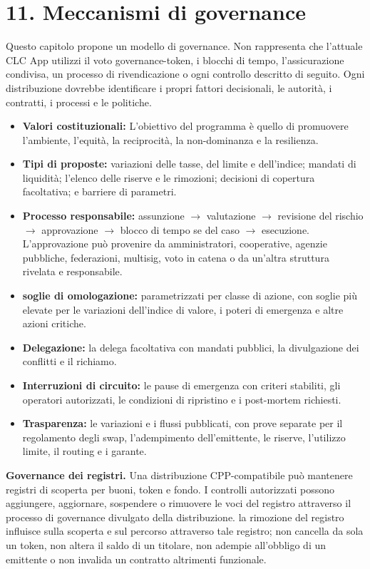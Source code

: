 \documentclass[11pt]{article}
\begin{document}
\section*{11. Meccanismi di governance}

Questo capitolo propone un modello di governance. Non rappresenta che l'attuale CLC App utilizzi il voto governance-token, i blocchi di tempo, l'assicurazione condivisa, un processo di rivendicazione o ogni controllo descritto di seguito. Ogni distribuzione dovrebbe identificare i propri fattori decisionali, le autorità, i contratti, i processi e le politiche.

\begin{itemize}[leftmargin=*]
\item \textbf{Valori costituzionali:} L'obiettivo del programma è quello di promuovere l'ambiente, l'equità, la reciprocità, la non-dominanza e la resilienza.
\item \textbf{Tipi di proposte:} variazioni delle tasse, del limite e dell'indice; mandati di liquidità; l'elenco delle riserve e le rimozioni; decisioni di copertura facoltativa; e barriere di parametri.
\item \textbf{Processo responsabile:} assunzione $\to$ valutazione $\to$ revisione del rischio $\to$ approvazione $\to$ blocco di tempo se del caso $\to$ esecuzione. L'approvazione può provenire da amministratori, cooperative, agenzie pubbliche, federazioni, multisig, voto in catena o da un'altra struttura rivelata e responsabile.
\item \textbf{soglie di omologazione:} parametrizzati per classe di azione, con soglie più elevate per le variazioni dell'indice di valore, i poteri di emergenza e altre azioni critiche.
\item \textbf{Delegazione:} la delega facoltativa con mandati pubblici, la divulgazione dei conflitti e il richiamo.
\item \textbf{Interruzioni di circuito:} le pause di emergenza con criteri stabiliti, gli operatori autorizzati, le condizioni di ripristino e i post-mortem richiesti.
\item \textbf{Trasparenza:} le variazioni e i flussi pubblicati, con prove separate per il regolamento degli swap, l'adempimento dell'emittente, le riserve, l'utilizzo limite, il routing e i garante.
\end{itemize}
\textbf{Governance dei registri.} Una distribuzione CPP-compatibile può mantenere registri di scoperta per buoni, token e fondo. I controlli autorizzati possono aggiungere, aggiornare, sospendere o rimuovere le voci del registro attraverso il processo di governance divulgato della distribuzione. la rimozione del registro influisce sulla scoperta e sul percorso attraverso tale registro; non cancella da sola un token, non altera il saldo di un titolare, non adempie all'obbligo di un emittente o non invalida un contratto altrimenti funzionale.
\end{document}
